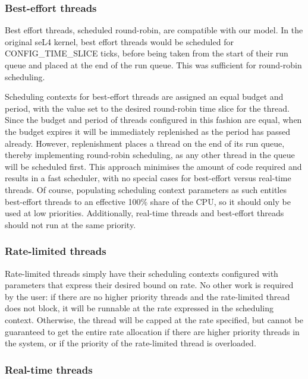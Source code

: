 \subsubsection{Best-effort threads}

Best effort threads, scheduled round-robin, are compatible with our model.
In the original seL4 kernel, best effort threads would be scheduled for CONFIG\_TIME\_SLICE ticks, before being taken from the start of their run queue and placed at the end of the run queue.
This was sufficient for round-robin scheduling.

Scheduling contexts for best-effort threads are assigned an equal budget and period, with the value set to the desired round-robin time slice for the thread.
Since the budget and period of threads configured in this fashion are equal, when the budget expires it will be immediately replenished as the period has passed already.
However, replenishment places a thread on the end of its run queue, thereby implementing round-robin scheduling, as any other thread in the queue will be scheduled first.
This approach minimises the amount of code required and results in a fast scheduler, with no special cases for best-effort versus real-time threads.
Of course, populating scheduling context parameters as such entitles best-effort threads to an effective 100\% share of the CPU, so it should only be used at low priorities.
Additionally, real-time threads and best-effort threads should not run at the same priority.

\subsubsection{Rate-limited threads}

Rate-limited threads simply have their scheduling contexts configured with parameters that express their desired bound on rate.
No other work is required by the user: if there are no higher priority threads and the rate-limited thread does not block, it will be runnable at the rate expressed in the scheduling context.
Otherwise, the thread will be capped at the rate specified, but cannot be guaranteed to get the entire rate allocation if there are higher priority threads in the system, or if the priority of the rate-limited thread is overloaded.

\subsubsection{Real-time threads}

